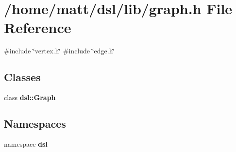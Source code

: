 \section{/home/matt/dsl/lib/graph.h \-File \-Reference}
\label{graph_8h}
{\ttfamily \#include \char`\"{}vertex.\-h\char`\"{}}\*
{\ttfamily \#include \char`\"{}edge.\-h\char`\"{}}\*
\subsection*{\-Classes}
\begin{DoxyCompactItemize}
\item 
class {\bf dsl\-::\-Graph}
\end{DoxyCompactItemize}
\subsection*{\-Namespaces}
\begin{DoxyCompactItemize}
\item 
namespace {\bf dsl}
\end{DoxyCompactItemize}
